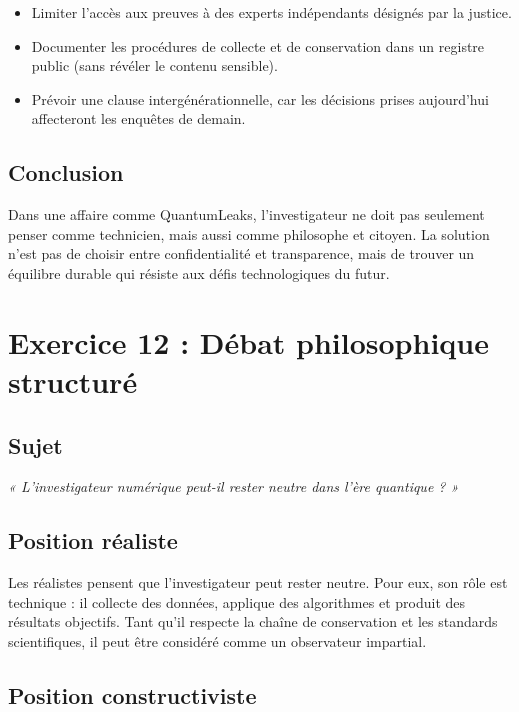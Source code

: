 \documentclass[12pt,a4paper]{report}
\begin{document}
	\begin{itemize}
		\item Limiter l’accès aux preuves à des experts indépendants désignés par la justice.
		\item Documenter les procédures de collecte et de conservation dans un registre public 
		(sans révéler le contenu sensible).
		\item Prévoir une clause intergénérationnelle, car les décisions prises aujourd’hui 
		affecteront les enquêtes de demain.
	\end{itemize}
	
	\subsection*{Conclusion}
	
	Dans une affaire comme QuantumLeaks, l’investigateur ne doit pas seulement penser 
	comme technicien, mais aussi comme philosophe et citoyen. La solution n’est pas de choisir 
	entre confidentialité et transparence, mais de trouver un équilibre durable qui résiste 
	aux défis technologiques du futur.
	
	\newpage
	\section*{Exercice 12 : Débat philosophique structuré}
	
	\subsection*{Sujet}
	
	\textit{« L’investigateur numérique peut-il rester neutre dans l’ère quantique ? »}
	
	\subsection*{Position réaliste}
	
	Les réalistes pensent que l’investigateur peut rester neutre. 
	Pour eux, son rôle est technique : il collecte des données, applique des algorithmes 
	et produit des résultats objectifs. Tant qu’il respecte la chaîne de conservation 
	et les standards scientifiques, il peut être considéré comme un observateur impartial.
	
	\subsection*{Position constructiviste}
	
\end{document}
